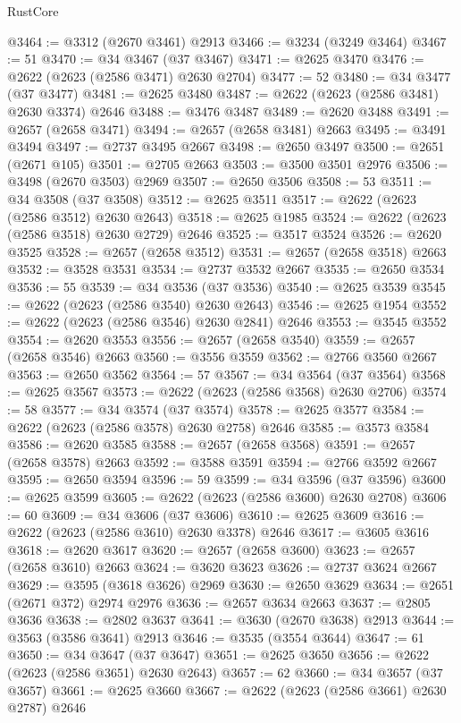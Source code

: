 \begin{lexlean}{RustCore}
\begin{coremodule}
@3464 := @3312 (@2670 @3461) @2913
@3466 := @3234 (@3249 @3464)
@3467 := 51
@3470 := @34 @3467 (@37 @3467)
@3471 := @2625 @3470
@3476 := @2622 (@2623 (@2586 @3471) @2630 @2704)
@3477 := 52
@3480 := @34 @3477 (@37 @3477)
@3481 := @2625 @3480
@3487 := @2622 (@2623 (@2586 @3481) @2630 @3374) @2646
@3488 := @3476 @3487
@3489 := @2620 @3488
@3491 := @2657 (@2658 @3471)
@3494 := @2657 (@2658 @3481) @2663
@3495 := @3491 @3494
@3497 := @2737 @3495 @2667
@3498 := @2650 @3497
@3500 := @2651 (@2671 @105)
@3501 := @2705 @2663
@3503 := @3500 @3501 @2976
@3506 := @3498 (@2670 @3503) @2969
@3507 := @2650 @3506
@3508 := 53
@3511 := @34 @3508 (@37 @3508)
@3512 := @2625 @3511
@3517 := @2622 (@2623 (@2586 @3512) @2630 @2643)
@3518 := @2625 @1985
@3524 := @2622 (@2623 (@2586 @3518) @2630 @2729) @2646
@3525 := @3517 @3524
@3526 := @2620 @3525
@3528 := @2657 (@2658 @3512)
@3531 := @2657 (@2658 @3518) @2663
@3532 := @3528 @3531
@3534 := @2737 @3532 @2667
@3535 := @2650 @3534
@3536 := 55
@3539 := @34 @3536 (@37 @3536)
@3540 := @2625 @3539
@3545 := @2622 (@2623 (@2586 @3540) @2630 @2643)
@3546 := @2625 @1954
@3552 := @2622 (@2623 (@2586 @3546) @2630 @2841) @2646
@3553 := @3545 @3552
@3554 := @2620 @3553
@3556 := @2657 (@2658 @3540)
@3559 := @2657 (@2658 @3546) @2663
@3560 := @3556 @3559
@3562 := @2766 @3560 @2667
@3563 := @2650 @3562
@3564 := 57
@3567 := @34 @3564 (@37 @3564)
@3568 := @2625 @3567
@3573 := @2622 (@2623 (@2586 @3568) @2630 @2706)
@3574 := 58
@3577 := @34 @3574 (@37 @3574)
@3578 := @2625 @3577
@3584 := @2622 (@2623 (@2586 @3578) @2630 @2758) @2646
@3585 := @3573 @3584
@3586 := @2620 @3585
@3588 := @2657 (@2658 @3568)
@3591 := @2657 (@2658 @3578) @2663
@3592 := @3588 @3591
@3594 := @2766 @3592 @2667
@3595 := @2650 @3594
@3596 := 59
@3599 := @34 @3596 (@37 @3596)
@3600 := @2625 @3599
@3605 := @2622 (@2623 (@2586 @3600) @2630 @2708)
@3606 := 60
@3609 := @34 @3606 (@37 @3606)
@3610 := @2625 @3609
@3616 := @2622 (@2623 (@2586 @3610) @2630 @3378) @2646
@3617 := @3605 @3616
@3618 := @2620 @3617
@3620 := @2657 (@2658 @3600)
@3623 := @2657 (@2658 @3610) @2663
@3624 := @3620 @3623
@3626 := @2737 @3624 @2667
@3629 := @3595 (@3618 @3626) @2969
@3630 := @2650 @3629
@3634 := @2651 (@2671 @372) @2974 @2976
@3636 := @2657 @3634 @2663
@3637 := @2805 @3636
@3638 := @2802 @3637
@3641 := @3630 (@2670 @3638) @2913
@3644 := @3563 (@3586 @3641) @2913
@3646 := @3535 (@3554 @3644)
@3647 := 61
@3650 := @34 @3647 (@37 @3647)
@3651 := @2625 @3650
@3656 := @2622 (@2623 (@2586 @3651) @2630 @2643)
@3657 := 62
@3660 := @34 @3657 (@37 @3657)
@3661 := @2625 @3660
@3667 := @2622 (@2623 (@2586 @3661) @2630 @2787) @2646

\end{coremodule}
\end{lexlean}
